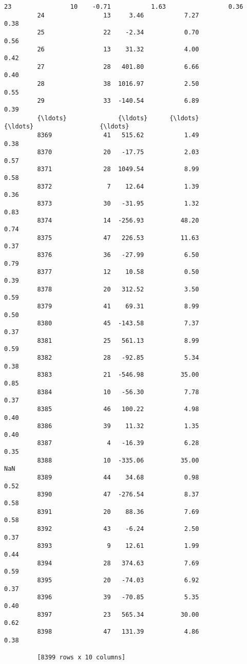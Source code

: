 \documentclass[11pt]{article}
\begin{document}
\begin{Verbatim}[commandchars=\\\{\}]
         23                10    -0.71           1.63                 0.36  
         24                13     3.46           7.27                 0.38  
         25                22    -2.34           0.70                 0.56  
         26                13    31.32           4.00                 0.42  
         27                28   401.80           6.66                 0.40  
         28                38  1016.97           2.50                 0.55  
         29                33  -140.54           6.89                 0.39  
         {\ldots}              {\ldots}      {\ldots}            {\ldots}                  {\ldots}  
         8369              41   515.62           1.49                 0.38  
         8370              20   -17.75           2.03                 0.57  
         8371              28  1049.54           8.99                 0.58  
         8372               7    12.64           1.39                 0.36  
         8373              30   -31.95           1.32                 0.83  
         8374              14  -256.93          48.20                 0.74  
         8375              47   226.53          11.63                 0.37  
         8376              36   -27.99           6.50                 0.79  
         8377              12    10.58           0.50                 0.39  
         8378              20   312.52           3.50                 0.59  
         8379              41    69.31           8.99                 0.50  
         8380              45  -143.58           7.37                 0.37  
         8381              25   561.13           8.99                 0.59  
         8382              28   -92.85           5.34                 0.38  
         8383              21  -546.98          35.00                 0.85  
         8384              10   -56.30           7.78                 0.37  
         8385              46   100.22           4.98                 0.40  
         8386              39    11.32           1.35                 0.40  
         8387               4   -16.39           6.28                 0.35  
         8388              10  -335.06          35.00                  NaN  
         8389              44    34.68           0.98                 0.52  
         8390              47  -276.54           8.37                 0.58  
         8391              20    88.36           7.69                 0.58  
         8392              43    -6.24           2.50                 0.37  
         8393               9    12.61           1.99                 0.44  
         8394              28   374.63           7.69                 0.59  
         8395              20   -74.03           6.92                 0.37  
         8396              39   -70.85           5.35                 0.40  
         8397              23   565.34          30.00                 0.62  
         8398              47   131.39           4.86                 0.38  
         
         [8399 rows x 10 columns]
\end{Verbatim}
            
\end{document}
